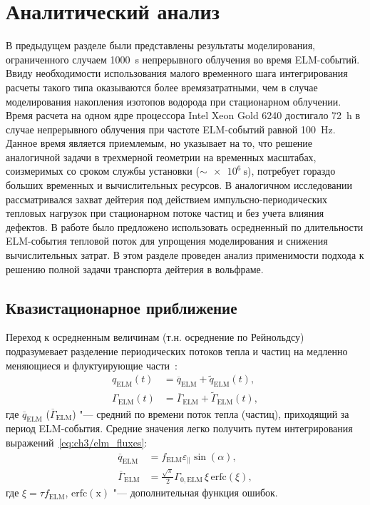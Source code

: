 \section{Аналитический анализ}\label{sec:ch3/sec3}

В предыдущем разделе были представлены результаты моделирования, ограниченного случаем \SI{1000}{\second} непрерывного облучения во время ELM-событий. Ввиду необходимости использования малого временного шага интегрирования расчеты такого типа оказываются более времязатратными, чем в случае моделирования накопления изотопов водорода при стационарном облучении. Время расчета на одном ядре процессора Intel Xeon Gold 6240 достигало \SI{72}{\hour} в случае непрерывного облучения при частоте ELM-событий равной \SI{100}{\hertz}. Данное время является приемлемым, но указывает на то, что решение аналогичной задачи в трехмерной геометрии на временных масштабах, соизмеримых со сроком службы установки (\( \sim \SI{e6}{\second}\)), потребует гораздо больших временных и вычислительных ресурсов. В аналогичном исследовании~\cite{Dasgupta2023} рассматривался захват дейтерия под действием импульсно-периодических тепловых нагрузок при стационарном потоке частиц и без учета влияния дефектов. В работе было предложено использовать осредненный по длительности ELM-события тепловой поток для упрощения моделирования и снижения вычислительных затрат. В этом разделе проведен анализ применимости подхода к решению полной задачи транспорта дейтерия в вольфраме.

\subsection{Квазистационарное приближение}
Переход к осредненным величинам (т.н. осреднение по Рейнольдсу) подразумевает разделение периодических потоков тепла и частиц на медленно меняющиеся и флуктуирующие части~\cite{Marenkov2012a}:
\begin{subequations}
	\label{eq:ch3/periodic_funcs}
	\begin{align}
		q_{\mathrm{ELM}}(t)&=\overline{q}_{\mathrm{ELM}} + \widetilde{q}_{\mathrm{ELM}}(t),\label{eq:decomp_heat}\\
		\Gamma_{\mathrm{ELM}}(t)&=\overline{\Gamma}_{\mathrm{ELM}} + \widetilde{\Gamma}_{\mathrm{ELM}}(t),
	\end{align}
\end{subequations}
где $\overline{q}_{\mathrm{ELM}}$ ($\overline{\Gamma}_{\mathrm{ELM}}$) "--- средний по времени поток тепла (частиц), приходящий за период ELM-события. Средние значения легко получить путем интегрирования выражений~\cref{eq:ch3/elm_fluxes}:
\begin{subequations}
	\label{eq:ch3/av_funcs}
	\begin{align}
		\overline{q}_{\mathrm{ELM}}&=f_{\mathrm{ELM}}\varepsilon_\parallel\sin(\alpha)\label{eq:av_heat},\\
		\overline{\Gamma}_{\mathrm{ELM}}& =\frac{\sqrt{\pi}}{2} \Gamma_{0,\mathrm{ELM}}\,\xi\,\mathrm{erfc}\left(\xi\right),\label{eq:av_flux}
	\end{align}
\end{subequations}
где $\xi=\tau f_{\mathrm{ELM}}$, $\mathrm{erfc(x)}$ "--- дополнительная функция ошибок.

